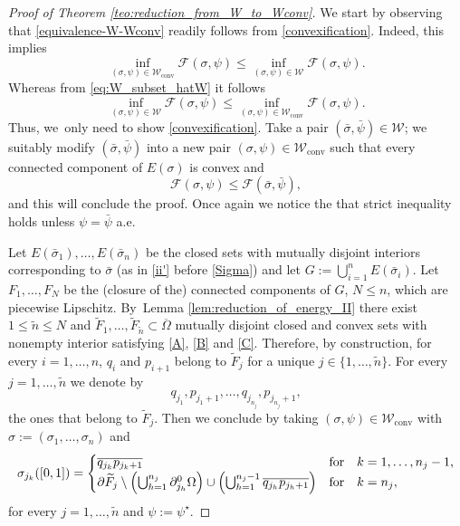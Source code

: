 \documentclass[JEP,XML,SOM,Unicode, NoFloatCountersInSection,published]{cedram}
\newcommand{\largercomp}{\mathcal W}
\let\Om\Omega
\newcommand\admclassconv{{\mathcal W_\mathrm{conv}}}
\theoremstyle{definition}
\begin{document}
\begin{proof}[Proof of Theorem \ref{teo:reduction_from_W_to_Wconv}]
We start by observing that \eqref{equivalence-W-Wconv} readily follows from \eqref{convexification}. Indeed, this implies
\begin{equation*}
\inf_{(\sigma,\psi)\in \admclassconv}
\mathcal{F}(\sigma,\psi)\le \inf_{(\sigma,\psi)
\in\largercomp} {\mathcal{F}}(\sigma,\psi)
.
\end{equation*}
Whereas from
\eqref{eq:W_subset_hatW}
it follows
\begin{equation*}
\inf_{(\sigma,\psi)\in\largercomp}
{\mathcal{F}}(\sigma,\psi)\le\inf_{(\sigma,\psi)\in\admclassconv }\mathcal{F}(\sigma,\psi).
\end{equation*}
Thus, we~only need to show \eqref{convexification}.
Take a pair $(\bar\sigma,\bar\psi)\in\largercomp$; we
suitably modify $(\bar\sigma,\bar\psi)$ into a new pair
$(\sigma,\psi)\in\admclassconv$ such that every connected component of $E(\sigma)$ is convex and
\begin{equation*}
\mathcal{F}(\sigma,\psi)\le{\mathcal F}(\bar\sigma,\bar\psi),
\end{equation*}
and this will conclude the proof. Once again we notice the that strict inequality holds unless $\psi=\bar\psi$ a.e.

Let $E(\bar\sigma_1),\dots,E(\bar\sigma_n)$ be the closed sets with mutually disjoint interiors corresponding to $\bar\sigma$ (as in \ref{ii'}
before \eqref{Sigma}) and let $G:=\bigcup_{i=1}^nE(\bar\sigma_i)$. Let
$F_1,\dots, F_N$ be the
(closure of the) connected components
of $G$, $N\leq n$, which are piecewise Lipschitz.
By~Lemma \ref{lem:reduction_of_energy_II} there exist $1\le \tilde n\le N$ and $\widetilde F_1,\dots,\widetilde F_{\tilde n}\subset\overline\Om$ mutually disjoint closed and convex sets with nonempty interior satisfying \eqref{A}, \eqref{B} and \eqref{C}.
Therefore, by construction, for every $i=1,\dots,n$,
$q_i$ and $p_{i+1}$ belong to $\widetilde F_j$ for a unique $j\in\{1,\dots,\tilde n\}$.
For every $j=1,\dots,\tilde n$ we denote by
\begin{equation*}
q_{j_1},p_{j_1+1},\dots, q_{j_{n_j}},p_{j_{n_j}+1},
\end{equation*}
the ones that belong to $\widetilde F_j$. Then we conclude by
taking $(\sigma,\psi)\in\admclassconv$ with $\sigma:=(\sigma_1,\dots,\sigma_n)$ and
\begin{equation*}
\sigma_{j_k}([0,1])=\begin{cases}
\overline{q_{j_k}p_{j_k+1}}&\text{for}\quad k=1,\dots,n_j-1,\\
\partial\widetilde F_j\setminus\Bigl(\bigcup_{h=1}^{n_j}\partial^0_{j_h}\Om\Bigr)\cup
\Bigl(\bigcup_{h=1}^{n_j-1}\overline{q_{j_h}p_{j_h+1}}\Bigr)&\text{for}\quad k=n_j,
\end{cases}
\end{equation*}
for every $j=1,\dots,\tilde n$ and $\psi:=\psi^\star$.
\end{proof}
\end{document}
